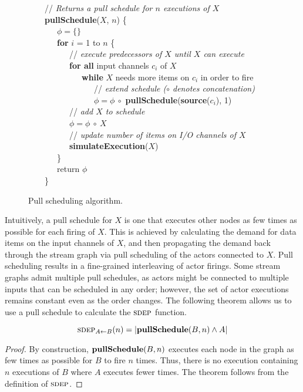 \begin{figure}[t]
\begin{center}
\parbox{3.8in}{
\mbox{} ~~~~// {\it Returns a pull schedule for $n$ executions of $X$} \\
\mbox{} ~~~~{\bf pullSchedule}($X$, $n$) \{\\
\mbox{} ~~~~~~~$\phi = \{ \}$ \\
\mbox{} ~~~~~~~{\bf for} $i$ = 1 to $n$ \{ \\
\mbox{} ~~~~~~~~~~// {\it execute predecessors of $X$ until $X$ can execute} \\
\mbox{} ~~~~~~~~~~{\bf for all} input channels $c_i$ of $X$ \\
\mbox{} ~~~~~~~~~~~~~{\bf while} $X$ needs more items on $c_i$ in order to fire \\
\mbox{} ~~~~~~~~~~~~~~~~// {\it extend schedule ($\circ$ denotes concatenation)} \\
\mbox{} ~~~~~~~~~~~~~~~~$\phi = \phi ~\circ$ {\bf pullSchedule}({\bf source}($c_i$), 1) \\
\mbox{} ~~~~~~~~~~// {\it add $X$ to schedule} \\
\mbox{} ~~~~~~~~~~$\phi = \phi~\circ~X$ \\
\mbox{} ~~~~~~~~~~// {\it update number of items on I/O channels of $X$} \\
\mbox{} ~~~~~~~~~~{\bf simulateExecution}($X$) \\
\mbox{} ~~~~~~~\} \\
\mbox{} ~~~~~~~return $\phi$ \\
\mbox{} ~~~~\}
}
\end{center}
\caption{Pull scheduling algorithm.\protect\label{fig:pull-scheduling}}
\end{figure}

Intuitively, a pull schedule for $X$ is one that executes other nodes
as few times as possible for each firing of $X$.  This is achieved by
calculating the demand for data items on the input channels of $X$,
and then propagating the demand back through the stream graph via pull
scheduling of the actors connected to $X$.  Pull scheduling results in
a fine-grained interleaving of actor firings.  Some stream graphs
admit multiple pull schedules, as actors might be connected to
multiple inputs that can be scheduled in any order; however, the set
of actor executions remains constant even as the order changes.  The
following theorem allows us to use a pull schedule to calculate the
$\textsc{sdep}$ function.
\begin{theorem} 
\label{thm1}
\[
\textsc{sdep}_{A \small{\leftarrow} B}(n) = |{\bf pullSchedule}(B, n) \wedge A|
\]
\end{theorem}
\begin{proof}
By construction, ${\bf pullSchedule}(B, n)$ executes each node in the
graph as few times as possible for $B$ to fire $n$ times.  Thus, there
is no execution containing $n$ executions of $B$ where $A$ executes
fewer times.  The theorem follows from the definition of $\textsc{sdep}$.
\end{proof}

